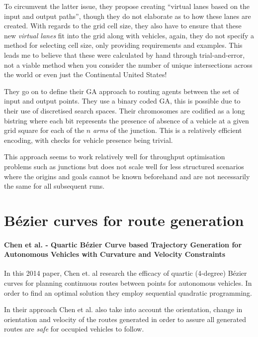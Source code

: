 To circumvent the latter issue, they propose creating ``virtual lanes based on the input and output paths'', though they do not elaborate as to how these lanes are created. With regards to the grid cell size, they also have to ensure that these new \textit{virtual lanes} fit into the grid along with vehicles, again, they do not specify a method for selecting cell size, only providing requirements and examples. This leads me to believe that these were calculated by hand through trial-and-error, not a viable method when you consider the number of unique intersections across the world or even just the Continental United States!

They go on to define their GA approach to routing agents between the set of input and output points. They use a binary coded GA, this is possible due to their use of discretised search spaces. Their chromosomes are codified as a long bistring where each bit represents the presence of absence of a vehicle at a given grid square for each of the $n$ \textit{arms} of the junction. This is a relatively efficient encoding, with checks for vehicle presence being trivial.

This approach seems to work relatively well for throughput optimisation problems such as junctions but does not scale well for less structured scenarios where the origins and goals cannot be known beforehand and are not necessarily the same for all subsequent runs.


\section{Bézier curves for route generation}

\paragraph{Chen et al. - Quartic Bézier Curve based Trajectory Generation for Autonomous Vehicles with Curvature and Velocity Constraints}

In this 2014 paper, Chen et. al research the efficacy of quartic (4-degree) Bézier curves for planning continuous routes between points for autonomous vehicles. In order to find an optimal solution they employ sequential quadratic programming.

In their approach Chen et al. also take into account the orientation, change in orientation and velocity of the routes generated in order to assure all generated routes are \textit{safe} for occupied vehicles to follow.


